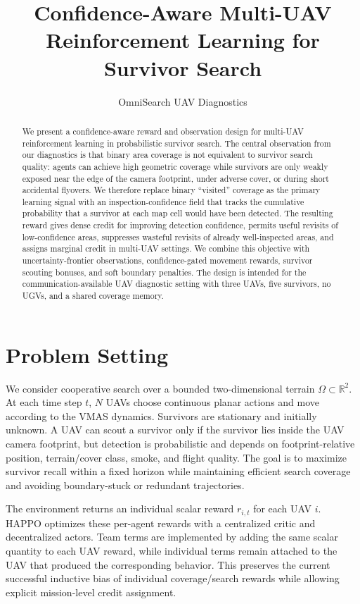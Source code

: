 \documentclass{article}
\title{Confidence-Aware Multi-UAV Reinforcement Learning for Survivor Search}
\author{OmniSearch UAV Diagnostics}
\date{}
\newcommand{\grid}{\Omega}
\begin{document}
\maketitle

\begin{abstract}
We present a confidence-aware reward and observation design for multi-UAV
reinforcement learning in probabilistic survivor search. The central observation
from our diagnostics is that binary area coverage is not equivalent to survivor
search quality: agents can achieve high geometric coverage while survivors are
only weakly exposed near the edge of the camera footprint, under adverse cover,
or during short accidental flyovers. We therefore replace binary ``visited''
coverage as the primary learning signal with an inspection-confidence field that
tracks the cumulative probability that a survivor at each map cell would have
been detected. The resulting reward gives dense credit for improving detection
confidence, permits useful revisits of low-confidence areas, suppresses wasteful
revisits of already well-inspected areas, and assigns marginal credit in
multi-UAV settings. We combine this objective with uncertainty-frontier
observations, confidence-gated movement rewards, survivor scouting bonuses, and
soft boundary penalties. The design is intended for the communication-available
UAV diagnostic setting with three UAVs, five survivors, no UGVs, and a shared
coverage memory.
\end{abstract}

\section{Problem Setting}

We consider cooperative search over a bounded two-dimensional terrain
\(\grid \subset \mathbb{R}^2\). At each time step \(t\), \(N\) UAVs choose
continuous planar actions and move according to the VMAS dynamics. Survivors are
stationary and initially unknown. A UAV can scout a survivor only if the survivor
lies inside the UAV camera footprint, but detection is probabilistic and depends
on footprint-relative position, terrain/cover class, smoke, and flight quality.
The goal is to maximize survivor recall within a fixed horizon while maintaining
efficient search coverage and avoiding boundary-stuck or redundant trajectories.

The environment returns an individual scalar reward \(r_{i,t}\) for each UAV
\(i\). HAPPO optimizes these per-agent rewards with a centralized critic and
decentralized actors. Team terms are implemented by adding the same scalar
quantity to each UAV reward, while individual terms remain attached to the UAV
that produced the corresponding behavior. This preserves the current successful
inductive bias of individual coverage/search rewards while allowing explicit
mission-level credit assignment.
\end{document}

